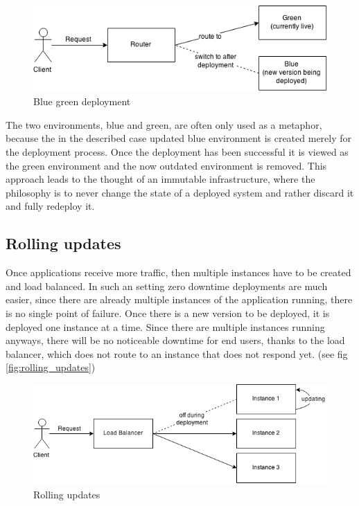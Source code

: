 \begin{figure}
  \includegraphics[scale=0.55]{pictures/blue_green_deployment.png}
  \caption{Blue green deployment}
  \centering
  \label{fig:blue_green_deployment}
\end{figure}

The two environments, blue and green, are often only used as a metaphor,
because the in the described case updated blue environment is created merely
for the deployment process. Once the deployment has been successful it is
viewed as the green environment and the now outdated environment is removed.
This approach leads to the thought of an immutable infrastructure, where the
philosophy is to never change the state of a deployed system and rather discard
it and fully redeploy it.

\subsection{Rolling updates}

Once applications receive more traffic, then multiple instances have to be
created and load balanced. In such an setting zero downtime deployments are
much easier, since there are already multiple instances of the application
running, there is no single point of failure. Once there is a new version to be
deployed, it is deployed one instance at a time. Since there are multiple
instances running anyways, there will be no noticeable downtime for end users,
thanks to the load balancer, which does not route to an instance that does not
respond yet. (see fig \ref{fig:rolling_updates})

\begin{figure}
  \includegraphics[scale=0.55]{pictures/rolling_updates.png}
  \caption{Rolling updates}
  \centering
  \label{fig:rollgin_updates}
\end{figure}


